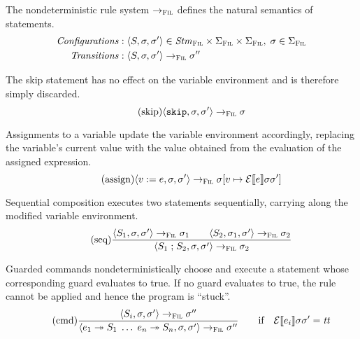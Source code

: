 \documentclass[a4paper,10pt,english]{article}
\begin{document}
The nondeterministic rule system $\rightarrow_{\textsc{Fil}}$ defines the natural semantics of statements.
\begin{align*}
	\mathit{Configurations} : & \;\langle S, \sigma, \sigma' \rangle \in \mathit{Stm}_\textsc{Fil} \times \Sigma_\textsc{Fil} \times \Sigma_\textsc{Fil},
	\; \sigma \in \Sigma_\textsc{Fil}
	\\
	\mathit{Transitions} : & \;\langle S, \sigma, \sigma' \rangle \rightarrow_{\textsc{Fil}} \sigma''
\end{align*}

The skip statement has no effect on the variable environment and is therefore simply discarded.
\begin{equation*}
	\tag{skip}
	\langle \mathtt{skip}, \sigma, \sigma' \rangle
		\rightarrow_{\textsc{Fil}}
	\sigma
\end{equation*}

Assignments to a variable update the variable environment accordingly, replacing the variable's current value with the value
obtained from the evaluation of the assigned expression.
\begin{equation*}
	\tag{assign}
	\langle v\; \mathtt{:=}\; e, \sigma, \sigma' \rangle
		\rightarrow_{\textsc{Fil}}
	\sigma[v \mapsto \mathcal{E} \llbracket e \rrbracket \sigma \sigma']
\end{equation*}

Sequential composition executes two statements sequentially, carrying along the modified variable environment.
\begin{equation*}
	\tag{seq}
	\dfrac
	{
		\langle S_1, \sigma, \sigma' \rangle
			\rightarrow_{\textsc{Fil}}
		\sigma_1
		\qquad
		\langle S_2, \sigma_1, \sigma' \rangle
			\rightarrow_{\textsc{Fil}}
		\sigma_2
	}
	{
		\langle S_1 \; \mathtt{;} \; S_2, \sigma, \sigma' \rangle
			\rightarrow_{\textsc{Fil}}
		\sigma_2
	}
\end{equation*}

Guarded commands nondeterministically choose and execute a statement whose corresponding guard evaluates to true. If no guard
evaluates to true, the rule cannot be applied and hence the program is ``stuck''.
\begin{equation*}
	\tag{cmd}
	\dfrac
	{
		\langle S_i, \sigma, \sigma' \rangle
			\rightarrow_{\textsc{Fil}}
		\sigma''
	}
	{
		\langle e_1 \; \mathtt{\twoheadrightarrow} \; S_1 \; \ldots \; e_n \; \mathtt{\twoheadrightarrow} \; S_n, \sigma, \sigma' \rangle
			\rightarrow_{\textsc{Fil}}
		\sigma''
	}
	\qquad \text{if} \quad \mathcal{E} \llbracket e_i \rrbracket \sigma \sigma' = \mathit{tt}
\end{equation*}
\end{document}
